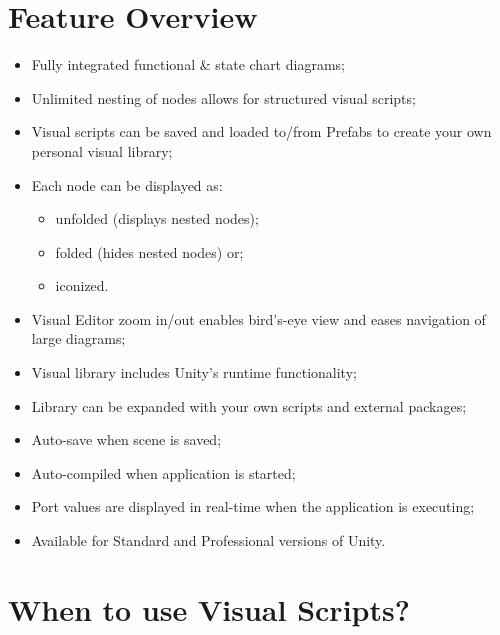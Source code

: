 \chapter{Feature Overview}
\label{featureoverview}

\begin{itemize}
\item Fully integrated functional \& state chart diagrams;

\item Unlimited nesting of nodes allows for structured visual scripts;

\item Visual scripts can be saved and loaded to\slash from Prefabs to create your own personal visual library;

\item Each node can be displayed as:

\begin{itemize}
\item unfolded (displays nested nodes);

\item folded (hides nested nodes) or;

\item iconized.

\end{itemize}

\item Visual Editor zoom in\slash out enables bird's-eye view and eases navigation of large diagrams;

\item Visual library includes Unity's runtime functionality;

\item Library can be expanded with your own scripts and external packages;

\item Auto-save when scene is saved;

\item Auto-compiled when application is started;

\item Port values are displayed in real-time when the application is executing;

\item Available for Standard and Professional versions of Unity.

\end{itemize}

\chapter{When to use Visual Scripts?}
\label{whentousevisualscripts}

